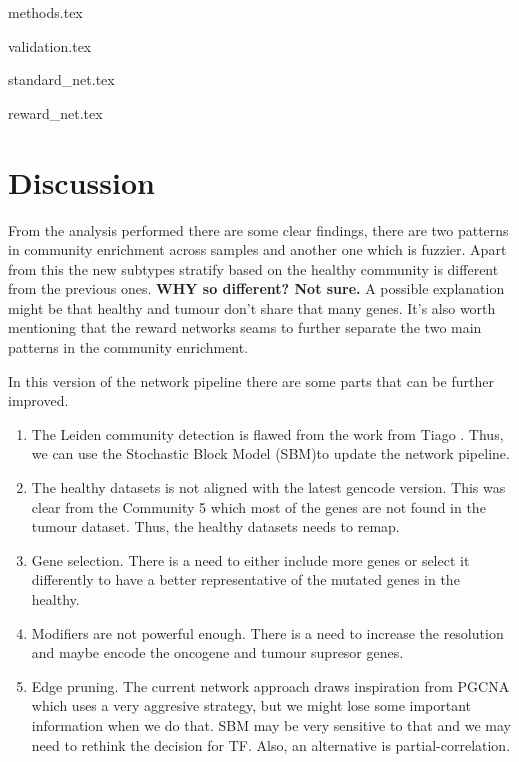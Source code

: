 {methods.tex}

{validation.tex}

{standard_net.tex}

{reward_net.tex}


\newpage

\section{Discussion}






From the analysis performed there are some clear findings, there are two patterns in community enrichment across samples and another one which is fuzzier. Apart from this the new subtypes stratify based on the healthy community is different from the previous ones. \textbf{WHY so different? Not sure.} A possible explanation might be that healthy and tumour don't share that many genes. It's also worth mentioning that the reward networks seams to further separate the two main patterns in the community enrichment.

In this version of the network pipeline there are some parts that can be further improved.
\begin{enumerate}
    \item The Leiden community detection is flawed from the work from Tiago \cite{Peixoto2021-jx,Fortunato2016-tj}. Thus, we can use the Stochastic Block Model (SBM)\cite{Peixoto2017-ua}to update the network pipeline.
    \item The healthy datasets is not aligned with the latest gencode version. This was clear from the Community 5 which most of the genes are not found in the tumour dataset. Thus, the healthy datasets needs to remap.
    \item Gene selection. There is a need to either include more genes or select it differently to have a better representative of the mutated genes in the healthy.
    \item Modifiers are not powerful enough. There is a need to increase the resolution and maybe encode the oncogene and tumour supresor genes.
    \item Edge pruning. The current network approach draws inspiration from PGCNA which uses a very aggresive strategy, but we might lose some important information when we do that. SBM may be very sensitive to that and we may need to rethink the decision for TF. Also, an alternative is partial-correlation.
\end{enumerate}


